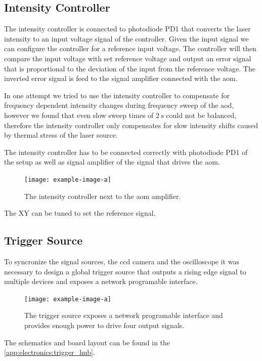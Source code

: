 \subsection{Intensity Controller}

The intensity controller is connected to photodiode PD1 that converts the
laser intensity to an input voltage signal of the controller. Given the
input signal we can configure the controller for a reference input voltage.
The controller will then compare the input voltage with set reference voltage
and output an error signal that is proportional to the deviation of the
input from the reference voltage. The inverted error signal is feed to the
signal amplifier connected with the \gls{aom}.

In one attempt we tried to use the intensity controller to compensate for
frequency dependent intensity changes during frequency sweep of the \gls{aod},
however we found that even slow sweep times of $\SI{2}{\second}$ could not
be balanced, therefore the intensity controller only compensates for slow
intensity shifts caused by thermal stress of the laser source.

The intensity controller has to be connected correctly with photodiode PD1
of the setup as well as signal amplifier of the signal that drives the
\gls{aom}.

\begin{figure}[h]
  \centering
  \texttt{[image: example-image-a]}
  \caption{The intensity controller next to the \gls{aom} amplifier.}
  \label{fig:intcontrol}
\end{figure}

The XY can be tuned to set the reference signal.

\subsection{Trigger Source}

To syncronize the signal sources, the \gls{ccd} camera and the oscilloscope
it was necessary to design a global trigger source that outputs a rising edge
signal to multiple devices and exposes a network programable interface.

\begin{figure}[h]
  \centering
  \texttt{[image: example-image-a]}
  \caption{The trigger source exposes a network programable interface and
  provides enough power to drive four output signals.}
  \label{fig:elec:trig}
\end{figure}
The schematics and board layout can be found in the
\cref{app:electronics:trigger_hub}.

